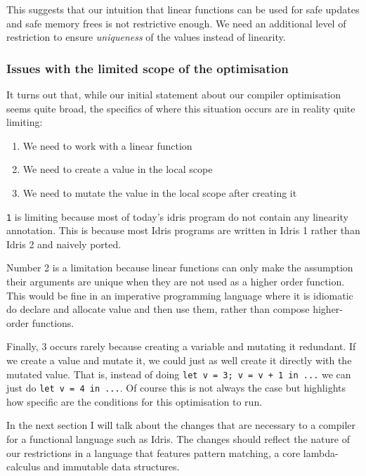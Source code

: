 \documentclass[
]{article}
\providecommand{\tightlist}{%
  \setlength{\itemsep}{0pt}\setlength{\parskip}{0pt}}
\begin{document}
This suggests that our intuition that linear functions can be used for
safe updates and safe memory frees is not restrictive enough. We need an
additional level of restriction to ensure \emph{uniqueness} of the
values instead of linearity.

\hypertarget{issues-with-the-limited-scope-of-the-optimisation}{%
\subsubsection{Issues with the limited scope of the
optimisation}\label{issues-with-the-limited-scope-of-the-optimisation}}

It turns out that, while our initial statement about our compiler
optimisation seems quite broad, the specifics of where this situation
occurs are in reality quite limiting:

\begin{enumerate}
\def\labelenumi{\arabic{enumi}.}
\tightlist
\item
  We need to work with a linear function
\item
  We need to create a value in the local scope
\item
  We need to mutate the value in the local scope after creating it
\end{enumerate}

\texttt{1} is limiting because most of today's idris program do not
contain any linearity annotation. This is because most Idris programs
are written in Idris 1 rather than Idris 2 and naively ported.

Number 2 is a limitation because linear functions can only make the
assumption their arguments are unique when they are not used as a higher
order function. This would be fine in an imperative programming language
where it is idiomatic do declare and allocate value and then use them,
rather than compose higher-order functions.

Finally, 3 occurs rarely because creating a variable and mutating it
redundant. If we create a value and mutate it, we could just as well
create it directly with the mutated value. That is, instead of doing
\texttt{let\ v\ =\ 3;\ v\textquotesingle{}\ =\ v\ +\ 1\ in\ ...} we can
just do \texttt{let\ v\ =\ 4\ in\ ...}. Of course this is not always the
case but highlights how specific are the conditions for this
optimisation to run.

In the next section I will talk about the changes that are necessary to
a compiler for a functional language such as Idris. The changes should
reflect the nature of our restrictions in a language that features
pattern matching, a core lambda-calculus and immutable data structures.
\end{document}
